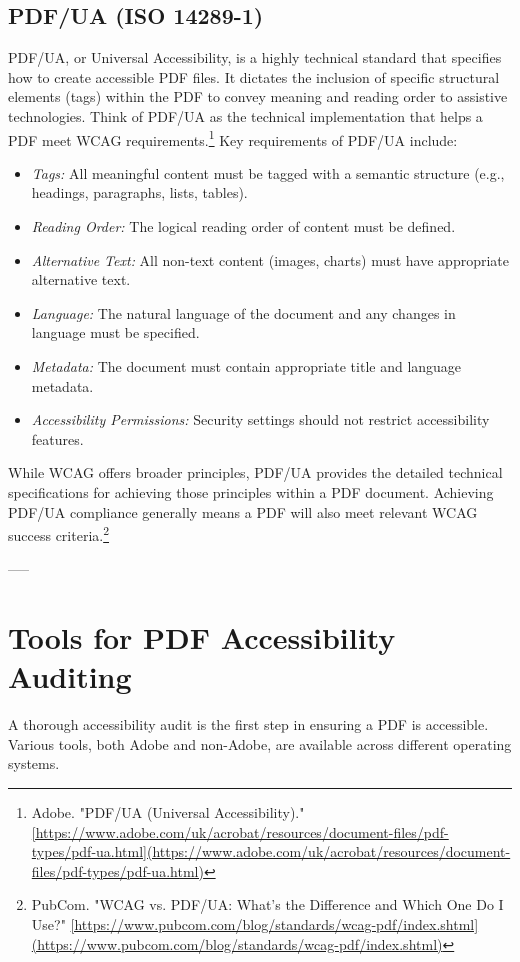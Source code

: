 \subsection{PDF/UA (ISO 14289-1)}
\label{subsec:pdfua}
PDF/UA, or Universal Accessibility, is a highly technical standard that specifies how to create accessible PDF files. It dictates the inclusion of specific structural elements (tags) within the PDF to convey meaning and reading order to assistive technologies. Think of PDF/UA as the technical implementation that helps a PDF meet WCAG requirements.\footnote{Adobe. "PDF/UA (Universal Accessibility)." \url{[https://www.adobe.com/uk/acrobat/resources/document-files/pdf-types/pdf-ua.html](https://www.adobe.com/uk/acrobat/resources/document-files/pdf-types/pdf-ua.html)}} Key requirements of PDF/UA include:
\begin{itemize}
\item \emph{Tags:} All meaningful content must be tagged with a semantic structure (e.g., headings, paragraphs, lists, tables).
\item \emph{Reading Order:} The logical reading order of content must be defined.
\item \emph{Alternative Text:} All non-text content (images, charts) must have appropriate alternative text.
\item \emph{Language:} The natural language of the document and any changes in language must be specified.
\item \emph{Metadata:} The document must contain appropriate title and language metadata.
\item \emph{Accessibility Permissions:} Security settings should not restrict accessibility features.
\end{itemize}
While WCAG offers broader principles, PDF/UA provides the detailed technical specifications for achieving those principles within a PDF document. Achieving PDF/UA compliance generally means a PDF will also meet relevant WCAG success criteria.\footnote{PubCom. "WCAG vs. PDF/UA: What's the Difference and Which One Do I Use?" \url{[https://www.pubcom.com/blog/standards/wcag-pdf/index.shtml](https://www.pubcom.com/blog/standards/wcag-pdf/index.shtml)}}

-----

\section{Tools for PDF Accessibility Auditing}
\label{sec:tools-auditing}
A thorough accessibility audit is the first step in ensuring a PDF is accessible. Various tools, both Adobe and non-Adobe, are available across different operating systems.

